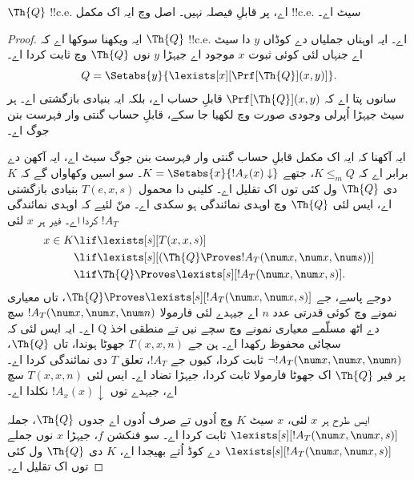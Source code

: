 \documentclass[../../../include/open-logic-section]{subfiles}
\begin{document}


\begin{thm}
$\Th{Q}$ !!{c.e.} اے، پر قابلِ فیصلہ نہیں۔ اصل وچ ایہ اک مکمل
!!{c.e.} سیٹ اے۔
\end{thm}

\begin{proof}
ایہ ویکھنا سوکھا اے کہ $\Th{Q}$ !!{c.e.} اے۔ ایہ اوہناں جملیاں
دے کوڈاں $y$ دا سیٹ اے جنہاں لئی کوئی ثبوت $x$ موجود اے جیہڑا
$y$ نوں $\Th{Q}$ وچ ثابت کردا اے۔
\[
Q = \Setabs{y}{\lexists[x][\Prf[\Th{Q}](x,y)]}.
\]
سانوں پتا اے کہ $\Prf[\Th{Q}](x,y)$ قابلِ حساب اے، بلکہ ایہ
بنیادی بازگشتی اے۔ ہر سیٹ جیہڑا اُپرلی وجودی صورت وچ لکھیا
جا سکے، قابلِ حساب گنتی وار فہرست بنن جوگ اے۔

ایہ آکھنا کہ ایہ اک مکمل قابلِ حساب گنتی وار فہرست بنن جوگ سیٹ
اے، ایہ آکھن دے برابر اے کہ $K
\leq_m Q$، جتھے $K = \Setabs{x}{!A_x(x) \downarrow}$۔
سو اسیں وکھاواں گے کہ $K$ دی $\Th{Q}$ ول کئی توں اک تقلیل
اے۔ کلینی دا محمول $T(e,x,s)$ بنیادی بازگشتی اے، ایس لئی
$\Th{Q}$ وچ اوہدی نمائندگی ہو سکدی اے۔ منّ لئیے کہ اوہدی
نمائندگی $!A_T$ کردا اے۔ فیر ہر $x$ لئی
\begin{align*}
x \in K & \lif \lexists[s][T(x,x,s)] \\
& \lif \lexists[s][(\Th{Q} \Proves !A_T(\num x,\num x, \num s))]
  \\
& \lif \Th{Q} \Proves \lexists[s][!A_T(\num x, \num x, s)].
\end{align*}
دوجے پاسے، جے $\Th{Q} \Proves \lexists[s][!A_T(\num x, \num x, s)]$،
تاں معیاری نمونے وچ کوئی قدرتی عدد $n$ اے جیہدے لئی فارمولا
$!A_T(\num x,
\num x, \num n)$ سچ اے۔ ایہ ایس لئی کہ Q دے اٹھ مسلّمے
معیاری نمونے وچ سچے نیں تے منطقی اخذ سچائی محفوظ رکھدا اے۔
ہن جے $T(x,x,n)$ جھوٹا ہوندا، تاں $\Th{Q}$،
$\lnot !A_T(\num x, \num x, \num n)$ ثابت کردا، کیوں جے
$!A_T$، تعلق $T$ دی نمائندگی کردا اے۔ پر فیر $\Th{Q}$
اک جھوٹا فارمولا ثابت کردا، جیہڑا تضاد اے۔ ایس لئی
$T(x,x,n)$ سچ اے، جیہدے توں $!A_x(x) \downarrow$ نکلدا اے۔

ایس طرح ہر $x$ لئی، $x$ سیٹ $K$ وچ اُدوں تے صرف اُدوں اے
جدوں $\Th{Q}$، جملہ $\lexists[s][!A_T(\num x,\num x,s)]$ ثابت
کردا اے۔ سو فنکشن $f$، جیہڑا $x$ نوں جملے
$\lexists[s][!A_T(\num x,
  \num x, s)]$ دے کوڈ اُتے بھیجدا اے، $K$ دی $\Th{Q}$ ول
کئی توں اک تقلیل اے۔
\end{proof}
\end{document}
